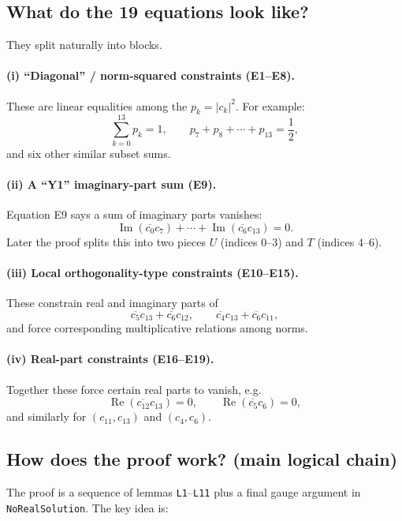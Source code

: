 \documentclass[11pt]{article}
\begin{document}
\subsection*{What do the 19 equations look like?}

They split naturally into blocks.

\paragraph{(i) ``Diagonal'' / norm-squared constraints (E1--E8).}
These are linear equalities among the $p_k = |c_k|^2$. For example:
\[
\sum_{k=0}^{13} p_k = 1,\qquad
p_7+p_8+\cdots+p_{13}=\frac12,
\]
and six other similar subset sums.

\paragraph{(ii) A ``Y1'' imaginary-part sum (E9).}
Equation E9 says a sum of imaginary parts vanishes:
\[
\operatorname{Im}(\overline{c_0}c_7)+\cdots+\operatorname{Im}(\overline{c_6}c_{13})=0.
\]
Later the proof splits this into two pieces $U$ (indices $0$--$3$) and $T$ (indices $4$--$6$).

\paragraph{(iii) Local orthogonality-type constraints (E10--E15).}
These constrain real and imaginary parts of
\[
\overline{c_5}c_{13} + \overline{c_6}c_{12}, \qquad
\overline{c_4}c_{13} + \overline{c_6}c_{11},
\]
and force corresponding multiplicative relations among norms.

\paragraph{(iv) Real-part constraints (E16--E19).}
Together these force certain real parts to vanish, e.g.
\[
\operatorname{Re}(\overline{c_{12}}c_{13})=0,\qquad
\operatorname{Re}(\overline{c_{5}}c_{6})=0,
\]
and similarly for $(c_{11},c_{13})$ and $(c_4,c_6)$.

\subsection*{How does the proof work? (main logical chain)}

The proof is a sequence of lemmas \texttt{L1}--\texttt{L11} plus a final gauge argument in \texttt{NoRealSolution}.  The key idea is:
\end{document}
